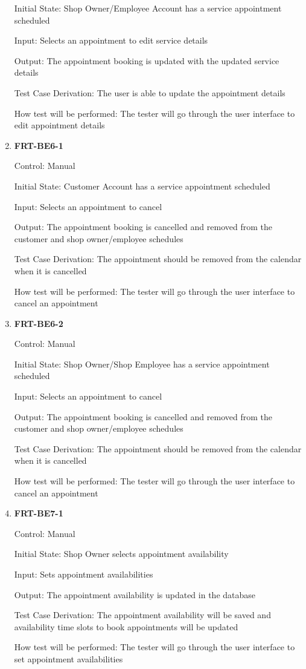 \documentclass[12pt, titlepage]{article}
\begin{document}
\begin{enumerate}
	      Initial State: Shop Owner/Employee Account has a service appointment scheduled

	      Input: Selects an appointment to edit service details

	      Output: The appointment booking is updated with the updated service details

	      Test Case Derivation: The user is able to update the appointment details

	      How test will be performed: The tester will go through the user interface to edit appointment
	      details

	\item \textbf{FRT-BE6-1}

	      Control: Manual

	      Initial State: Customer Account has a service appointment scheduled

	      Input: Selects an appointment to cancel

	      Output: The appointment booking is cancelled and removed from the customer and shop owner/employee
	      schedules

	      Test Case Derivation: The appointment should be removed from the calendar when it is cancelled

	      How test will be performed: The tester will go through the user interface to cancel an appointment

	\item \textbf{FRT-BE6-2}

	      Control: Manual

	      Initial State: Shop Owner/Shop Employee has a service appointment scheduled

	      Input: Selects an appointment to cancel

	      Output: The appointment booking is cancelled and removed from the customer and shop owner/employee
	      schedules

	      Test Case Derivation: The appointment should be removed from the calendar when it is cancelled

	      How test will be performed: The tester will go through the user interface to cancel an appointment

	\item \textbf{FRT-BE7-1}

	      Control: Manual

	      Initial State: Shop Owner selects appointment availability

	      Input: Sets appointment availabilities

	      Output: The appointment availability is updated in the database

	      Test Case Derivation: The appointment availability will be saved and availability time slots to
	      book appointments will be updated

	      How test will be performed: The tester will go through the user interface to set appointment
	      availabilities
\end{enumerate}
\end{document}
